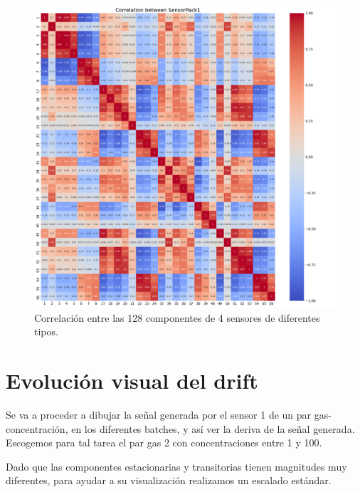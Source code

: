 \begin{figure}
	\centering
	\includegraphics[width=0.7\linewidth]{../py_imgs/Step0_1_1_CorrelationBetweenFeatures_Data1}
	\caption[Correlation map de 4 sensores de cada tipo]{Correlación entre las 128 componentes de 4 sensores de diferentes tipos.}
	\label{fig:step011correlationbetweenfeaturesdata1}
\end{figure}


\section{Evolución  visual del drift}

Se va a proceder a dibujar la señal generada por el sensor 1 de un par gas-concentración, en los diferentes batches, y así ver la deriva de la señal generada. Escogemos para tal tarea el par gas 2 con concentraciones entre 1 y 100.


Dado que las componentes estacionarias y transitorias tienen magnitudes muy diferentes, para ayudar a su visualización realizamos un escalado estándar.

